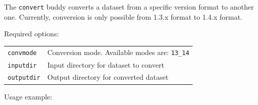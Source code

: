 The \texttt{convert} buddy converts a dataset from a specific version format to another one. Currently, conversion is only possible from 1.3.x format to 1.4.x format. 

\bigskip

\noindent Required options:
\begin{center}
\begin{tabularx}{\linewidth}{lX} 
\texttt{convmode}&Conversion mode. Available modes are: \texttt{13\_14}\\
\texttt{inputdir}&Input directory for dataset to convert\\ 
\texttt{outputdir}&Output directory for converted dataset\\
\end{tabularx}
\end{center}

\bigskip

\noindent Usage example:\\


